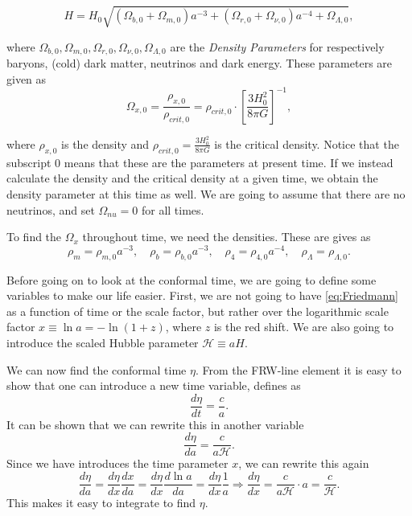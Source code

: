 \documentclass[a4paper,norsk, 10pt]{article}
\begin{document}
\begin{equation}\label{eq:Friedmann}
H = H_0 \sqrt{(\Omega_{b,0} + \Omega_{m,0})a^{-3} + (\Omega_{r,0} + \Omega_{\nu,0})a^{-4} + \Omega_{\Lambda,0}},
\end{equation}

where $\Omega_{b,0}, \Omega_{m,0}, \Omega_{r,0}, \Omega_{\nu,0}, \Omega_{\Lambda,0}$ are the \textit{Density Parameters} for respectively baryons, (cold) dark matter, neutrinos and dark energy. These parameters are given as
\begin{equation}\label{eq:Omega}
\Omega_{x,0} = \frac{\rho_{x,0}}{\rho_{crit,0}} = \rho_{crit,0}\cdot\left[\frac{3H_0^2}{8\pi G}\right]^{-1},
\end{equation}

where $\rho_{x,0}$ is the density and $\rho_{crit,0} = \frac{3H_0^2}{8\pi G}$ is the critical density. Notice that the subscript $0$ means that these are the parameters at present time. If we instead calculate the density and the critical density at a given time, we obtain the density parameter at this time as well. We are going to assume that there are no neutrinos, and set $\Omega_{nu} = 0$ for all times.

To find the $\Omega_{x}$ throughout time, we need the densities. These are gives as
\begin{equation}\label{eq:rho}
\rho_{m} = \rho_{m,0} a^{-3}, \quad \rho_{b} = \rho_{b,0} a^{-3}, \quad \rho_{4} = \rho_{4,0} a^{-4}, \quad \rho_{\Lambda} = \rho_{\Lambda,0}.
\end{equation}

Before going on to look at the conformal time, we are going to define some variables to make our life easier. First, we are not going to have \eqref{eq:Friedmann} as a function of time or the scale factor, but rather over the logarithmic scale factor $x \equiv \ln a = - \ln(1+z)$, where $z$ is the red shift. We are also going to introduce the scaled Hubble parameter $\mathcal{H} \equiv aH$.

We can now find the conformal time $\eta$. From the FRW-line element it is easy to show that one can introduce a new time variable, defines as
\begin{equation}
\frac{d\eta}{dt} = \frac{c}{a}.
\end{equation}
It can be shown that we can rewrite this in another variable
\begin{equation}
\frac{d \eta}{da} = \frac{c}{a\mathcal{H}}.
\end{equation}
Since we have introduces the time parameter $x$, we can rewrite this again
\begin{equation}\label{eq:deta/dx}
\frac{d\eta}{da} = \frac{d\eta}{dx}\frac{dx}{da} = \frac{d\eta}{dx}\frac{d \ln a}{da} = \frac{d\eta}{dx}\frac{1}{a} \Rightarrow \frac{d\eta}{dx} = \frac{c}{a\mathcal{H}}\cdot a = \frac{c}{\mathcal{H}}.
\end{equation}
This makes it easy to integrate to find $\eta$.
\end{document}
